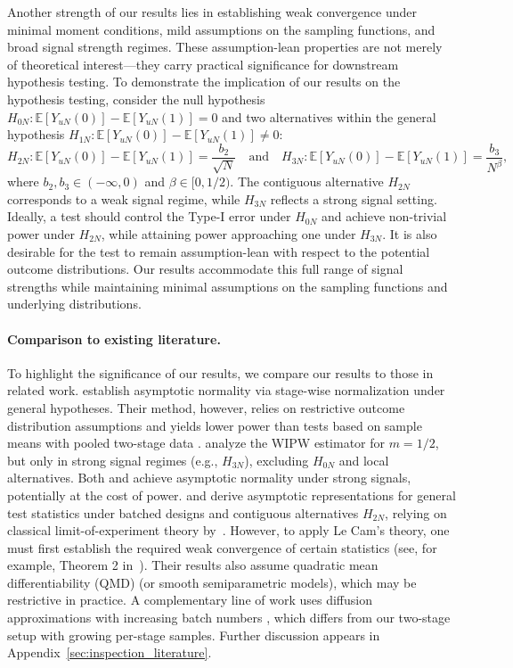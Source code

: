 \documentclass[12pt]{article}
\newcommand{\E}{\mathbb E}								%
\begin{document}
Another strength of our results lies in establishing weak convergence under minimal moment conditions, mild assumptions on the sampling functions, and broad signal strength regimes. These assumption-lean properties are not merely of theoretical interest—they carry practical significance for downstream hypothesis testing. To demonstrate the implication of our results on the hypothesis testing, consider the null hypothesis $H_{0N}:\E[Y_{uN}(0)] - \E[Y_{uN}(1)]=0$ and two alternatives within the general hypothesis $H_{1N}: \E[Y_{uN}(0)] - \E[Y_{uN}(1)] \neq 0$:
\[
H_{2N}: \E[Y_{uN}(0)] - \E[Y_{uN}(1)] = \frac{b_2}{\sqrt{N}} \quad \text{and}\quad
H_{3N}: \E[Y_{uN}(0)] - \E[Y_{uN}(1)] = \frac{b_3}{N^\beta},
\]
where $b_2, b_3 \in (-\infty, 0)$ and $\beta \in [0, 1/2)$. The contiguous alternative $H_{2N}$ corresponds to a weak signal regime, while $H_{3N}$ reflects a strong signal setting. Ideally, a test should control the Type-I error under $H_{0N}$ and achieve non-trivial power under $H_{2N}$, while attaining power approaching one under $H_{3N}$. It is also desirable for the test to remain assumption-lean with respect to the potential outcome distributions.
Our results accommodate this full range of signal strengths while maintaining minimal assumptions on the sampling functions and underlying distributions.

\paragraph{Comparison to existing literature.}
To highlight the significance of our results, we compare our results to those in related work. \citet{Zhang2020} establish asymptotic normality via stage-wise normalization under general hypotheses. Their method, however, relies on restrictive outcome distribution assumptions and yields lower power than tests based on sample means with pooled two-stage data \citep{Hirano2023}. \citet{Hadad2021} analyze the WIPW estimator for $m = 1/2$, but only in strong signal regimes (e.g., $H_{3N}$), excluding $H_{0N}$ and local alternatives. Both \citet{Zhang2020} and \citet{Hadad2021} achieve asymptotic normality under strong signals, potentially at the cost of power. \citet{Hirano2023} and \citet{adusumilli2023optimal} derive asymptotic representations for general test statistics under batched designs and contiguous alternatives $H_{2N}$, relying on classical limit-of-experiment theory by~\citet{le1972limits}. However, to apply Le Cam's theory, one must first establish the required weak convergence of certain statistics (see, for example, Theorem 2 in~\citep{Hirano2023}). Their results also assume quadratic mean differentiability (QMD) (or smooth semiparametric models), which may be restrictive in practice. A complementary line of work uses diffusion approximations with increasing batch numbers \citep{fan2021diffusion,kuang2024weak}, which differs from our two-stage setup with growing per-stage samples. Further discussion appears in Appendix~\ref{sec:inspection_literature}.
\end{document}
